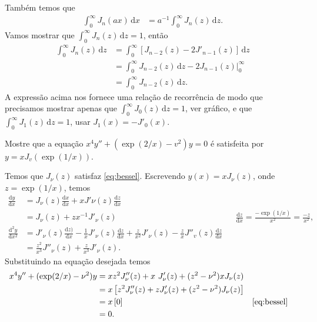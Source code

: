 \documentclass[a4paper,12pt, leqno, answers]{exam}
\begin{document}
\begin{questions}
\begin{solution}
        Tamb\'{e}m temos que
        \begin{align*}
            \int_0^\infty J_n(a x) \,\mathrm{d}x &= a^{-1} \int_0^\infty J_n(z) \,\mathrm{d}z.
        \end{align*}
        Vamos mostrar que $\int_0^\infty J_n(z) \,\mathrm{d}z = 1$, ent\~{a}o
        \begin{align*}
            \int_0^\infty J_n(z) \,\mathrm{d}z &= \int_0^\infty \left[ J_{n - 2}(z) - 2 J'_{n - 1}(z) \right] \,\mathrm{d}z \\
            &= \int_0^\infty J_{n - 2}(z) \,\mathrm{d}z - \left. 2 J_{n - 1}(z) \right|_0^\infty \\
            &= \int_0^\infty J_{n - 2}(z) \,\mathrm{d}z.
        \end{align*}
        A express\~{a}o acima nos fornece uma rela\c{c}\~{a}o de recorr\^{e}ncia de modo que precisamos mostrar apenas que $\int_0^\infty J_0(z) \,\mathrm{d}z = 1$, ver gr\'{a}fico, e que $\int_0^\infty J_1(z) \,\mathrm{d}z = 1$, usar $J_1(x) = - J'_0(x)$.
    \end{solution}

    \question Mostre que a equa\c{c}\~{a}o $x^4 y'' + (\exp(2/x) - v^2)y = 0$ \'{e} satisfeita por $y = x J_v(\exp(1/x))$.
    \begin{solution}
        Temos que $J_\nu(z)$ satisfaz \eqref{eq:bessel}. Escrevendo $y(x) = x J_\nu(z)$, onde $z = \exp(1/x)$, temos
        \begin{align*}
            \frac{\mathrm{d}y}{\mathrm{d}x} &= J_\nu(z) \frac{\mathrm{d}x}{\mathrm{d}x} + x J'\nu(z) \frac{\mathrm{d}z}{\mathrm{d}x} \\
            &= J_\nu(z) + z x^{-1} J'_\nu(z) && \frac{\mathrm{d}z}{\mathrm{d}x} = \frac{-\exp(1/x)}{x^2} = \frac{-z}{x^2}, \\
            \frac{\mathrm{d}^2y}{\mathrm{d}x^2} &= J'_\nu(z) \frac{\mathrm{d}z)}{\mathrm{d}x} - \frac{1}{x} J'_\nu(z) \frac{\mathrm{d} z}{\mathrm{d}x} + \frac{z}{x^2} J'_\nu(z) - \frac{z}{x} J''_v(z) \frac{\mathrm{d}z}{\mathrm{d}x} \\
            &= \frac{z^2}{x^3} J''_\nu(z) + \frac{z}{x^3} J'_\nu(z).
        \end{align*}
        Substituindo na equa\c{c}\~{a}o desejada temos
        \begin{align*}
            x^4 y'' + (\exp(2/x) - \nu^2) y &= x z^2 J''_\nu(z) + x \ J'_\nu(z) + (z^2 - \nu^2) x J_\nu(z) \\
            &= x \left[ z^2 J''_\nu(z) + z J'_\nu(z) + (z^2 - \nu^2) J_\nu(z) \right] \\
            &= x \left[ 0 \right] && \eqref{eq:bessel} \\
            &= 0.
        \end{align*}
    \end{solution}


\end{questions}
\end{document}
